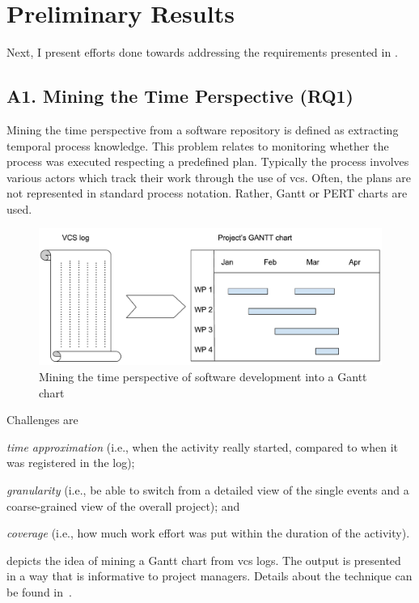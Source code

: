 \documentclass[a4paper,11pt]{article}
\begin{document}
\section{Preliminary Results} \label{sec:preliminary-results}

Next, I present efforts done towards addressing the requirements presented in .

\subsection{A1. Mining the Time Perspective (RQ1)}

Mining the time perspective from a software repository is defined as extracting temporal process knowledge. This problem relates to monitoring whether the process was executed respecting a predefined plan. Typically the process involves various actors which track their work through the use of \gls{vcs}. Often, the plans are not represented in standard process notation. Rather, Gantt or PERT charts are used. 

\begin{figure}[h]
	\centering
	\includegraphics[width=0.6\linewidth]{figures/VCS-log-to-Gantt}
	\caption{Mining the time perspective of software development into a Gantt chart}
	\label{fig:vcs-log-to-gantt}
\end{figure}

Challenges are 
\begin{inparaenum}[\itshape i)]
	\item \emph{time approximation} (i.e., when the activity really started, compared to when it was registered in the log);
	\item \emph{granularity} (i.e., be able to switch from a detailed view of the single events and a coarse-grained view of the overall project); and
	\item \emph{coverage} (i.e., how much work effort was put within the duration of the activity).
\end{inparaenum} 
 depicts the idea of mining a Gantt chart from \gls{vcs} logs. The output is presented in a way that is informative to project managers. Details about the technique can be found in~\cite{Bala2015}. 
\end{document}
